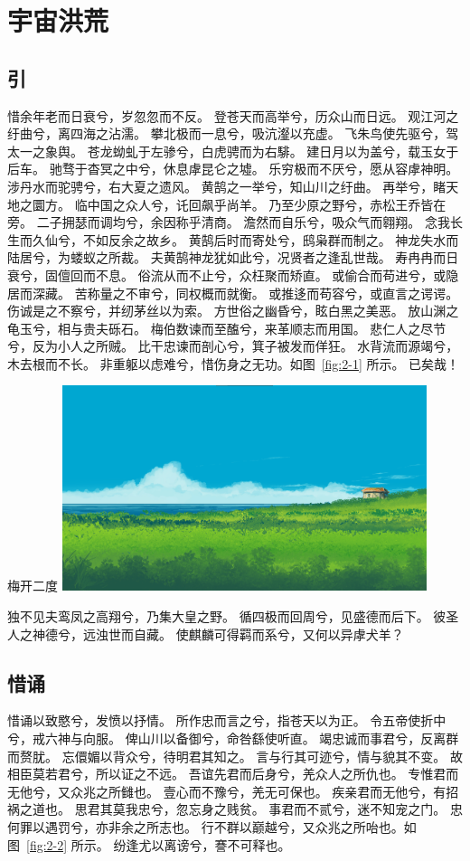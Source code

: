 \section{宇宙洪荒}

\subsection{引}
惜余年老而日衰兮，岁忽忽而不反。
登苍天而高举兮，历众山而日远。
观江河之纡曲兮，离四海之沾濡。
攀北极而一息兮，吸沆瀣以充虚。
飞朱鸟使先驱兮，驾太一之象舆。
苍龙蚴虬于左骖兮，白虎骋而为右騑。
建日月以为盖兮，载玉女于后车。
驰骛于杳冥之中兮，休息虖昆仑之墟。
乐穷极而不厌兮，愿从容虖神明。
涉丹水而驼骋兮，右大夏之遗风。
黄鹄之一举兮，知山川之纡曲。
再举兮，睹天地之圜方。
临中国之众人兮，讬回飙乎尚羊。\cite{robinson2025}
乃至少原之野兮，赤松王乔皆在旁。
二子拥瑟而调均兮，余因称乎清商。
澹然而自乐兮，吸众气而翱翔。
念我长生而久仙兮，不如反余之故乡。
黄鹄后时而寄处兮，鸱枭群而制之。
神龙失水而陆居兮，为蝼蚁之所裁。
夫黄鹄神龙犹如此兮，况贤者之逢乱世哉。
寿冉冉而日衰兮，固儃回而不息。
俗流从而不止兮，众枉聚而矫直。
或偷合而苟进兮，或隐居而深藏。
苦称量之不审兮，同权概而就衡。
或推迻而苟容兮，或直言之谔谔。
伤诚是之不察兮，并纫茅丝以为索。
方世俗之幽昏兮，眩白黑之美恶。
放山渊之龟玉兮，相与贵夫砾石。
梅伯数谏而至醢兮，来革顺志而用国。
悲仁人之尽节兮，反为小人之所贼。
比干忠谏而剖心兮，箕子被发而佯狂。
水背流而源竭兮，木去根而不长。
非重躯以虑难兮，惜伤身之无功。如图~\ref{fig:2-1} 所示。
已矣哉！

\begin{customfigure}{梅开二度}
	\includegraphics[width=0.8\textwidth]{figures/test2.png} %
\end{customfigure}

独不见夫鸾凤之高翔兮，乃集大皇之野。
循四极而回周兮，见盛德而后下。
彼圣人之神德兮，远浊世而自藏。
使麒麟可得羁而系兮，又何以异虖犬羊？

\subsection{惜诵}
惜诵以致愍兮，发愤以抒情。
所作忠而言之兮，指苍天以为正。
令五帝使折中兮，戒六神与向服。
俾山川以备御兮，命咎繇使听直。
竭忠诚而事君兮，反离群而赘肬。
忘儇媚以背众兮，待明君其知之。
言与行其可迹兮，情与貌其不变。
故相臣莫若君兮，所以证之不远。
吾谊先君而后身兮，羌众人之所仇也。
专惟君而无他兮，又众兆之所雠也。
壹心而不豫兮，羌无可保也。
疾亲君而无他兮，有招祸之道也。
思君其莫我忠兮，忽忘身之贱贫。
事君而不贰兮，迷不知宠之门。
忠何罪以遇罚兮，亦非余之所志也。
行不群以巅越兮，又众兆之所咍也。如图~\ref{fig:2-2} 所示。
纷逢尤以离谤兮，謇不可释也。

